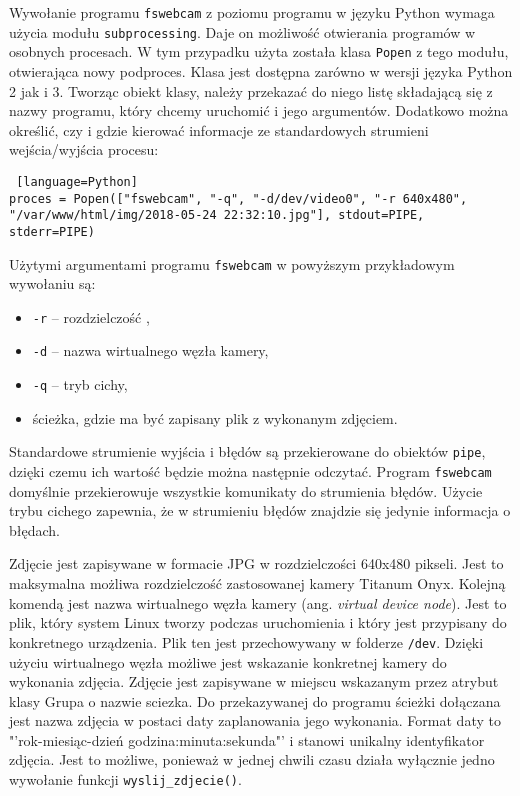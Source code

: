 \documentclass[a4paper,12pt,twoside]{article}
\begin{document}
Wywołanie programu \texttt{fswebcam} z poziomu programu w języku Python wymaga użycia modułu \texttt{subprocessing}. Daje on możliwość otwierania programów w osobnych procesach. W tym przypadku użyta została klasa \texttt{Popen} z tego modułu, otwierająca nowy podproces. Klasa jest dostępna zarówno w wersji języka Python 2 jak i 3. Tworząc obiekt klasy, należy przekazać do niego listę składającą się z nazwy programu, który chcemy uruchomić i jego argumentów. Dodatkowo można określić, czy i gdzie kierować informacje ze standardowych strumieni wejścia/wyjścia procesu:

\begin{lstlisting} [language=Python]
proces = Popen(["fswebcam", "-q", "-d/dev/video0", "-r 640x480", "/var/www/html/img/2018-05-24 22:32:10.jpg"], stdout=PIPE, stderr=PIPE)
\end{lstlisting}

Użytymi argumentami programu \texttt{fswebcam} w powyższym przykładowym wywołaniu są:
\begin{itemize}
\item \texttt{-r} -- rozdzielczość , 
\item \texttt{-d} -- nazwa wirtualnego węzła kamery,
\item \texttt{-q} -- tryb cichy,
\item ścieżka, gdzie ma być zapisany plik z wykonanym zdjęciem.
\end{itemize}
Standardowe strumienie wyjścia i błędów są przekierowane do obiektów \texttt{pipe}, dzięki czemu ich wartość będzie można następnie odczytać. Program \texttt{fswebcam} domyślnie przekierowuje wszystkie komunikaty do strumienia błędów. Użycie trybu cichego zapewnia, że w strumieniu błędów znajdzie się jedynie informacja o błędach.

Zdjęcie jest zapisywane w formacie JPG w rozdzielczości 640x480 pikseli. Jest to maksymalna możliwa rozdzielczość zastosowanej kamery Titanum Onyx. Kolejną komendą jest nazwa wirtualnego węzła kamery (ang. \textit{virtual device node}). Jest to plik, który system Linux tworzy podczas uruchomienia i który jest przypisany do konkretnego urządzenia. Plik ten jest przechowywany w folderze \texttt{/dev}. Dzięki użyciu wirtualnego węzła możliwe jest wskazanie konkretnej kamery do wykonania zdjęcia. Zdjęcie jest zapisywane w miejscu wskazanym przez atrybut klasy Grupa o nazwie sciezka. Do przekazywanej do programu ścieżki dołączana jest nazwa zdjęcia w postaci daty zaplanowania jego wykonania. Format daty to "'rok-miesiąc-dzień godzina:minuta:sekunda"' i stanowi unikalny identyfikator zdjęcia. Jest to możliwe, ponieważ w jednej chwili czasu działa wyłącznie jedno wywołanie funkcji \texttt{wyslij{\_}zdjecie()}.
\end{document}
